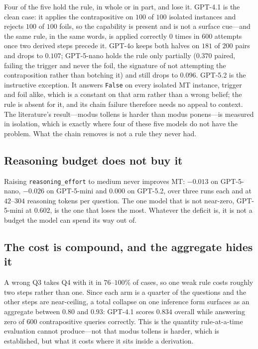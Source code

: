 \documentclass{article}
\begin{document}
Four of the five hold the rule, in whole or in part, and lose it. GPT-4.1 is
the clean case: it applies the contrapositive on $100$ of $100$ isolated
instances and rejects $100$ of $100$ foils, so the capability is present and is
not a surface cue---and the same rule, in the same words, is applied correctly
$0$ times in $600$ attempts once two derived steps precede it. GPT-4o keeps
both halves on $181$ of $200$ pairs and drops to $0.107$; GPT-5-nano holds the
rule only partially ($0.370$ paired, failing the trigger and never the foil,
the signature of not attempting the contraposition rather than botching it) and
still drops to $0.096$. GPT-5.2 is the instructive
exception. It answers \texttt{False} on every isolated MT instance, trigger and
foil alike, which is a constant on that arm rather than a wrong belief; the rule
is absent for it, and its chain failure therefore needs no appeal to context.
The literature's result---modus tollens is harder than modus ponens---is
measured in isolation, which is exactly where four of these five models do not
have the problem. What the chain removes is not a rule they never had.

\subsection{Reasoning budget does not buy it}
Raising
\texttt{reasoning\_effort} to medium never improves MT: $-0.013$ on GPT-5-nano,
$-0.026$ on GPT-5-mini and $0.000$ on GPT-5.2, over three runs each and at
$42$--$304$ reasoning tokens per question. The one model that is not near-zero,
GPT-5-mini at $0.602$, is the one that loses the most. Whatever the
deficit is, it is not a budget the model can spend its way out of.

\subsection{The cost is compound, and the aggregate hides it}
A wrong Q3 takes
Q4 with it in $76$--$100\%$ of cases, so one weak rule costs roughly two steps
rather than one. Since each arm is a quarter of the questions and the other
steps are near-ceiling, a total collapse on one inference form surfaces as an
aggregate between $0.80$ and $0.93$: GPT-4.1 scores $0.834$ overall while
answering zero of $600$ contrapositive queries correctly. This is the quantity
rule-at-a-time evaluation cannot produce---not that modus tollens is harder,
which is established, but what it costs where it sits inside a derivation.
\end{document}
